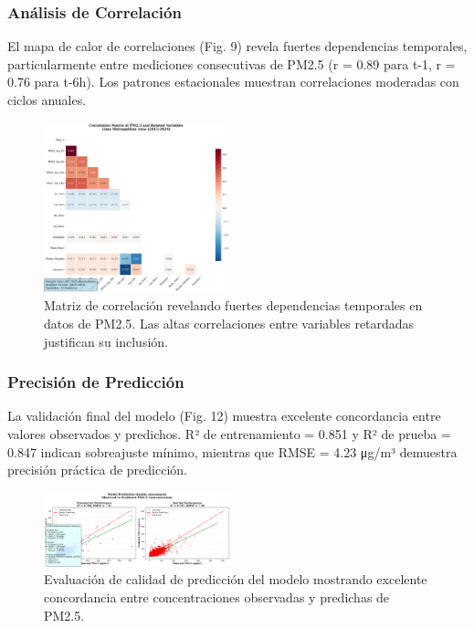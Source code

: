 \documentclass[conference]{IEEEtran}
\begin{document}
\subsubsection{Análisis de Correlación}

El mapa de calor de correlaciones (Fig. 9) revela fuertes dependencias temporales, particularmente entre mediciones consecutivas de PM2.5 (r = 0.89 para t-1, r = 0.76 para t-6h). Los patrones estacionales muestran correlaciones moderadas con ciclos anuales.

\begin{figure}[htbp]
\centerline{\includegraphics[width=0.48\textwidth]{Figura_9_Mapa_Correlaciones_PM25.png}}
\caption{Matriz de correlación revelando fuertes dependencias temporales en datos de PM2.5. Las altas correlaciones entre variables retardadas justifican su inclusión.}
\label{fig:correlations}
\end{figure}

\subsubsection{Precisión de Predicción}

La validación final del modelo (Fig. 12) muestra excelente concordancia entre valores observados y predichos. R² de entrenamiento = 0.851 y R² de prueba = 0.847 indican sobreajuste mínimo, mientras que RMSE = 4.23 μg/m³ demuestra precisión práctica de predicción.

\begin{figure}[htbp]
\centerline{\includegraphics[width=0.48\textwidth]{Figura_12_Prediccion_vs_Observado_PM25.png}}
\caption{Evaluación de calidad de predicción del modelo mostrando excelente concordancia entre concentraciones observadas y predichas de PM2.5.}
\label{fig:validation}
\end{figure}
\end{document}
